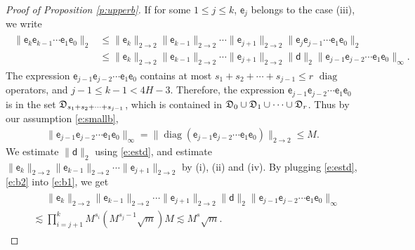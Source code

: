 \documentclass{article}
\numberwithin{equation}{section}
\newcommand{\fD}{{\frak D}}
\newcommand{\sfe}{{\mathsf e}}
\newcommand{\sfd}{{\mathsf d}}
\DeclareMathOperator{\diag}{diag}
\renewcommand{\leq}{\leqslant}
\newcommand{\1}{\mathds{1}}
\theoremstyle{plain} %
\begin{document}
\begin{proof}[Proof of Proposition \ref{p:upperb}]
If for some $1\leq j\leq k$, $\sfe_j$ belongs to the case (iii), we write
\begin{align}\begin{split}\label{e:b1}
\|\sfe_k\sfe_{k-1}\cdots\sfe_1\sfe_0\|_2
&\leq  \|\sfe_k\|_{2\rightarrow 2}\|\sfe_{k-1}\|_{2\rightarrow 2}\cdots\|\sfe_{j+1}\|_{2\rightarrow 2}
\|\sfe_j\sfe_{j-1}\cdots \sfe_1\sfe_0\|_{2}\\
&\leq  \|\sfe_k\|_{2\rightarrow 2}\|\sfe_{k-1}\|_{2\rightarrow 2}\cdots\|\sfe_{j+1}\|_{2\rightarrow 2}
\|\sfd\|_2\|\sfe_{j-1}\sfe_{j-2}\cdots \sfe_1\sfe_0\|_{\infty}.
\end{split}\end{align}
The expression $\sfe_{j-1}\sfe_{j-2}\cdots \sfe_1\sfe_0$ contains at most $s_1+s_2+\cdots+s_{j-1}\leq r$ $\diag$ operators, and $j-1\leq k-1<4H-3$. Therefore, the expression $\sfe_{j-1}\sfe_{j-2}\cdots \sfe_1\sfe_0$ is in the set $\fD_{s_1+s_2+\cdots+s_{j-1}}$, which is contained in $\fD_0\cup\fD_1\cup\cdots\cup\fD_{r}$. Thus by our assumption \eqref{e:smallb}, 
\begin{align}\label{e:b2}
\|\sfe_{j-1}\sfe_{j-2}\cdots \sfe_1\sfe_0\|_\infty=\|\diag(\sfe_{j-1}\sfe_{j-2}\cdots \sfe_1\sfe_0)\|_{2\rightarrow2}
\leq M.
\end{align}
We estimate $\|\sfd\|_2$ using \eqref{e:estd}, and estimate $\|\sfe_k\|_{2\rightarrow 2} \|\sfe_{k-1}\|_{2\rightarrow 2}\cdots\|\sfe_{j+1}\|_{2\rightarrow 2}$ by (i), (ii) and (iv).
By plugging \eqref{e:estd}, \eqref{e:b2} into \eqref{e:b1}, we get
\begin{align*}\begin{split}
&\phantom{{}={}}\|\sfe_k\|_{2\rightarrow 2}\|\sfe_{k-1}\|_{2\rightarrow 2}\cdots\|\sfe_{j+1}\|_{2\rightarrow 2}
\|\sfd\|_2\|\sfe_{j-1}\sfe_{j-2}\cdots \sfe_1\sfe_0\|_{\infty}\\
&\lesssim \prod_{i=j+1}^k M^{s_i} (M^{s_j-1}\sqrt m) M
\lesssim M^{s}\sqrt m.
\end{split}\end{align*}



\end{proof}
\end{document}
